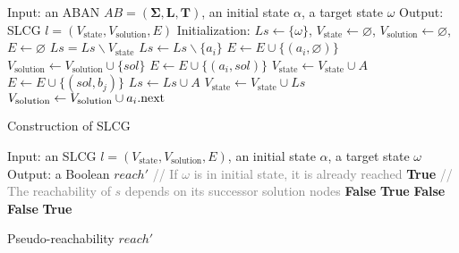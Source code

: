 \begin{algorithm}[ht]
\begin{algorithmic}
\State Input: an ABAN $AB=(\mathbf{\Sigma},\mathbf{L},\mathbf{T})$, an initial state $\alpha$, a target state $\omega$
\State Output: SLCG $l=(V_{\mathrm{state}},V_{\mathrm{solution}}, E)$
\State Initialization: 
$Ls\gets \{\omega\}$, $V_{\mathrm{state}}\gets\varnothing$, $V_{\mathrm{solution}}\gets \varnothing$, $E\gets \varnothing$
    \State $Ls=Ls\backslash V_{\mathrm{state}}$
		\State $Ls\gets Ls\backslash \{a_i\}$
			\State $E\gets E\cup \{(a_i,\varnothing)\} $
    	\Else
    		    \State $V_{\mathrm{solution}}\gets V_{\mathrm{solution}}\cup \{sol\}$
    		    \State $E\gets E\cup \{(a_i,sol)\} $
    			\State $V_{\mathrm{state}}\gets V_{\mathrm{state}}\cup {A}$
    				\State $E\gets E\cup \{(sol,b_j)\} $
    			\EndFor
    			\State $Ls\gets Ls\cup A$
                \State $V_{\mathrm{state}}\gets V_{\mathrm{state}}\cup Ls$
    		\EndFor
    		\State$V_{\mathrm{solution}}\gets V_{\mathrm{solution}}\cup a_i{\rm .next}$           
    	\EndIf
	\EndFor
\EndWhile
\State{}
\end{algorithmic}
\caption{Construction of SLCG}\label{AlgConstructLCG}
\end{algorithm}

\begin{algorithm}[ht]
\begin{algorithmic}
\State Input: an SLCG $l=(V_{\mathrm{state}}, {V_\mathrm{solution}},E)$, an initial state $\alpha$, a target state $\omega$
\State Output: a Boolean $reach'$
\State \textcolor{gray}{// If $\omega$ is in initial state, it is already reached}
\If {$\omega\in \alpha$}
   \Return \textbf{True}
\EndIf
\State \textcolor{gray}{// The reachability of $s$ depends on its successor solution nodes}
    \Return \textbf{False}
\EndIf
{}
    \Return \textbf{True}
    \EndIf
\EndFor
 \Return \textbf{False}
\EndProcedure
{}
    \Return \textbf{False}
    \EndIf
\EndFor
\Return \textbf{True}
\EndProcedure
\end{algorithmic}
\caption{Pseudo-reachability $reach'$}\label{algPseudo}
\end{algorithm}


